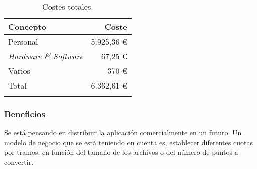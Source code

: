 \begin{longtable}[]{@{}lr@{}}
\toprule
\begin{minipage}[b]{0.4\columnwidth}\raggedright\strut
\textbf{Concepto}\strut
\end{minipage} & \begin{minipage}[b]{0.22\columnwidth}\raggedright\strut
\textbf{Coste}\strut
\end{minipage}\tabularnewline
\midrule
\endhead
\begin{minipage}[t]{0.4\columnwidth}\raggedright\strut
Personal\strut
\end{minipage} & \begin{minipage}[t]{0.22\columnwidth}\raggedright\strut
5.925,36 \euro{}\strut
\end{minipage}\tabularnewline
\begin{minipage}[t]{0.4\columnwidth}\raggedright\strut
\emph{Hardware \& Software}\strut
\end{minipage} & \begin{minipage}[t]{0.22\columnwidth}\raggedright\strut
67,25 \euro{}\strut
\end{minipage}\tabularnewline
\begin{minipage}[t]{0.4\columnwidth}\raggedright\strut
Varios\strut
\end{minipage} & \begin{minipage}[t]{0.22\columnwidth}\raggedright\strut
370 \euro{}\strut
\end{minipage}\tabularnewline
\midrule
\begin{minipage}[t]{0.4\columnwidth}\raggedright\strut
Total\strut
\end{minipage} & \begin{minipage}[t]{0.22\columnwidth}\raggedright\strut
 6.362,61 \euro{}\strut
\end{minipage}\tabularnewline
\bottomrule
\caption{Costes totales.}
\end{longtable}

\subsubsection{Beneficios}

Se está pensando en distribuir la aplicación comercialmente en un futuro. Un modelo de negocio que se está teniendo en cuenta es, establecer diferentes cuotas por tramos, en función del tamaño de los archivos o del número de puntos a convertir.

